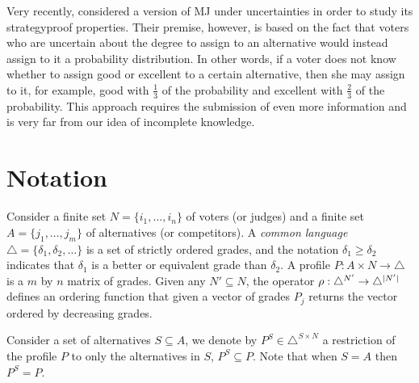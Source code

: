 Very recently, \citet{Varloot2022} considered a version of \ac{MJ} under uncertainties in order to study its strategyproof properties. Their premise, however, is based on the fact that voters who are uncertain about the degree to assign to an alternative would instead assign to it a probability distribution. In other words, if a voter does not know whether to assign good or excellent to a certain alternative, then she may assign to it, for example, good with $\frac{1}{3}$ of the probability and excellent with $\frac{2}{3}$ of the probability. 
This approach requires the submission of even more information and is very far from our idea of incomplete knowledge.


\section{Notation}
\label{sec:complete}
Consider a finite set $N=\{i_1, \dots, i_n\}$ of voters (or judges) and a finite set $A=\{j_1, \dots, j_m\}$ of alternatives (or competitors). 
A \textit{common language} $\triangle = \{ \delta_1, \delta_2, \dots \}$ is a set of strictly ordered grades, and the notation $\delta_1 \geq \delta_2$ indicates that $\delta_1$ is a better or equivalent grade than $\delta_2$. A profile $P : A\times N \rightarrow \triangle$ is a $m$ by $n$ matrix of grades. Given any $N'\subseteq N$, the operator $\rho: \triangle^{N'} \rightarrow \triangle^{\lvert N'\rvert}$ defines an ordering function that given a vector of grades $P_j$ returns the vector ordered by decreasing grades.

Consider a set of alternatives $S\subseteq A$,
we denote by $P^S \in \triangle^{S \times N}$ a restriction of the profile $P$ to only the alternatives in $S$, $P^S \subseteq P$. Note that when $S=A$ then $P^S=P$.


